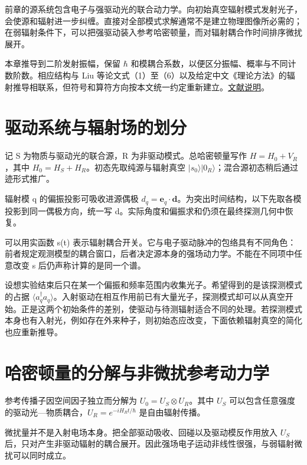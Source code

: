 \documentclass[UTF8,a4paper,zihao=-4,openany,fontset=fandol]{ctexbook}
\begin{document}
前章的源系统包含电子与强驱动光的联合动力学。向初始真空辐射模式发射光子，会使源和辐射进一步纠缠。直接对全部模式求解通常不是建立物理图像所必需的；在弱辐射条件下，可以把强驱动装入参考哈密顿量，而对辐射耦合作时间排序微扰展开。



本章推导到二阶发射振幅，保留 $\hbar$ 和模耦合系数，以便区分振幅、概率与不同计数阶数。相应结构与 Liu 等论文式（1）至（6）以及给定中文《理论方法》的辐射推导相联系，但符号和算符方向按本文统一约定重新建立。\hyperref[ch:E]{文献说明}。



\section{驱动系统与辐射场的划分}\label{sec:06:1}


记 S 为物质与驱动光的联合源，R 为非驱动模式。总哈密顿量写作 $H=H_0+V_R$，其中 $H_0=H_S+H_R$。初态先取纯源与辐射真空 $|s_0\rangle|0_R\rangle$；混合源初态稍后通过迹形式推广。



辐射模 q 的偏振投影可吸收进源偶极 $d_q=\mathbf e_q\cdot\mathbf d$。为突出时间结构，以下先取各模投影到同一偶极方向，统一写 d。实际角度和偏振求和仍须在最终探测几何中恢复。



可以用实函数 s(t) 表示辐射耦合开关。它与电子驱动脉冲的包络具有不同角色：前者规定观测模型的耦合窗口，后者决定源本身的强场动力学。不能在不同项中任意改变 s 后仍声称计算的是同一个谱。



设想实验结束后只在某一个偏振和频率范围内收集光子。希望得到的是该探测模式的占据 $\langle a_q^\dagger a_q\rangle$。入射驱动在相互作用前已有大量光子，探测模式却可以从真空开始。正是这两个初始条件的差别，使驱动与待测辐射适合不同的处理。若探测模式本身也有入射光，例如存在外来种子，则初始态应改变，下面依赖辐射真空的简化也应重新推导。



\section{哈密顿量的分解与非微扰参考动力学}\label{sec:06:2}


参考传播子因空间因子独立而分解为 $U_0=U_S\otimes U_R$。其中 $U_S$ 可以包含任意强度的驱动光—物质耦合，$U_R=e^{-iH_Rt/\hbar}$ 是自由辐射传播。



微扰量并不是入射电场本身。把全部驱动吸收、回碰以及驱动模反作用放入 $U_S$ 后，只对产生非驱动辐射的耦合展开。因此强场电子运动非线性很强，与弱辐射微扰可以同时成立。
\end{document}
